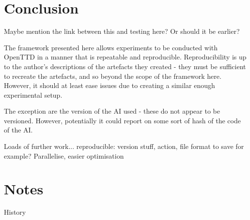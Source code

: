 \documentclass[logo,msc]{infthesis}           %
\begin{document}
\chapter{Conclusion}

\begin{itemize}
\begin{item}
Maybe mention the link between this and testing here? Or should it be earlier?
\end{item}
\end{itemize}

The framework presented here allows experiments to be conducted with OpenTTD in a manner that is repeatable and reproducible. Reproducibility is up to the author's descriptions of the artefacts they created - they must be sufficient to recreate the artefacts, and so beyond the scope of the framework here. However, it should at least ease issues due to creating a similar enough experimental setup.

The exception are the version of the AI used - these do not appear to be versioned. However, potentially it could report on some sort of hash of the code of the AI.

Loads of further work... reproducible: version stuff, action, file format to save for example? Parallelise, easier optimisation

\chapter{Notes}

History
\end{document}
